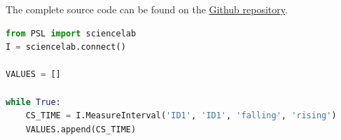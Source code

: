 The complete source code can be found on the \href{https://github.com/bench-os/bench-os}{Github repository}.

\begin{lstlisting}[style=CStyle, language=python, caption={Python script to communicate with the PSLab and retrieve the interval measurement}, label={lst:python-pslab}]
from PSL import sciencelab
I = sciencelab.connect()

VALUES = []

while True:
    CS_TIME = I.MeasureInterval('ID1', 'ID1', 'falling', 'rising')
    VALUES.append(CS_TIME)
\end{lstlisting}